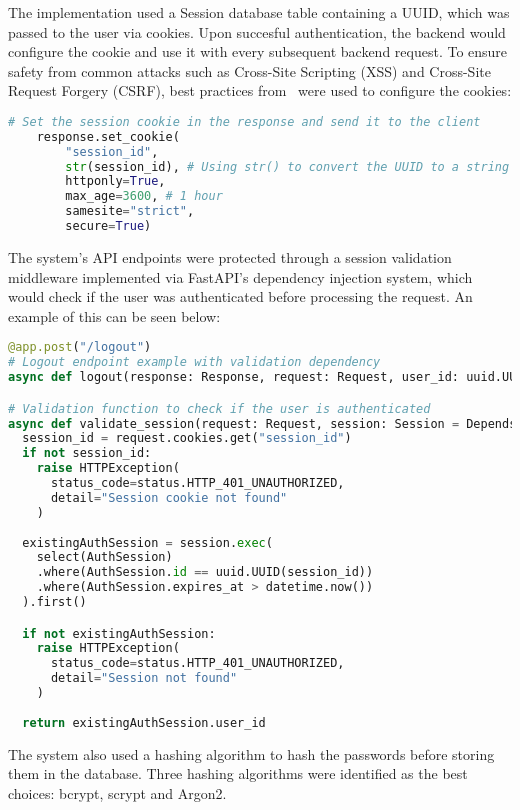 The implementation used a Session database table containing a UUID, which was passed to the user via cookies. Upon succesful authentication, the backend would configure the cookie and use it with every subsequent backend request. To ensure safety from common attacks such as Cross-Site Scripting (XSS) and Cross-Site Request Forgery (CSRF), best practices from~\cite{owasp,mozilla} were used to configure the cookies:

\begin{lstlisting}[language=Python, caption=Session Cookie Flags]
    # Set the session cookie in the response and send it to the client
    response.set_cookie(
        "session_id",
        str(session_id), # Using str() to convert the UUID to a string
        httponly=True,
        max_age=3600, # 1 hour
        samesite="strict",
        secure=True)
\end{lstlisting}

The system's API endpoints were protected through a session validation middleware implemented via FastAPI's dependency injection system, which would check if the user was authenticated before processing the request. An example of this can be seen below:

\begin{lstlisting}[language=Python, caption=FastAPI Dependency for Session Validation]
@app.post("/logout")
# Logout endpoint example with validation dependency
async def logout(response: Response, request: Request, user_id: uuid.UUID = Depends(validate_session), session: Session = Depends(get_session))

# Validation function to check if the user is authenticated
async def validate_session(request: Request, session: Session = Depends(get_session)):
  session_id = request.cookies.get("session_id")
  if not session_id:
    raise HTTPException(
      status_code=status.HTTP_401_UNAUTHORIZED, 
      detail="Session cookie not found"
    )
    
  existingAuthSession = session.exec(
    select(AuthSession)
    .where(AuthSession.id == uuid.UUID(session_id))
    .where(AuthSession.expires_at > datetime.now())
  ).first()

  if not existingAuthSession:
    raise HTTPException(
      status_code=status.HTTP_401_UNAUTHORIZED, 
      detail="Session not found"
    )
    
  return existingAuthSession.user_id
\end{lstlisting}

The system also used a hashing algorithm to hash the passwords before storing them in the database. Three hashing algorithms were identified as the best choices: bcrypt, scrypt and Argon2. 

